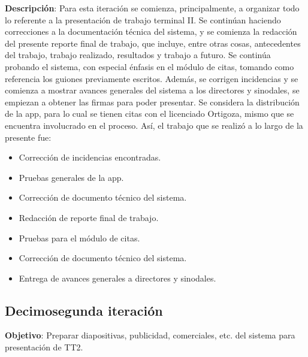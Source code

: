 \noindent
\textbf{Descripción}: Para esta iteración se comienza, principalmente, a organizar todo lo referente a la presentación de trabajo terminal II. Se continúan haciendo correcciones a la documentación técnica del sistema, y se comienza la redacción del presente reporte final de trabajo, que incluye, entre otras cosas, antecedentes del trabajo, trabajo realizado, resultados y trabajo a futuro.
\newline
\newline
Se continúa probando el sistema, con especial énfasis en el módulo de citas, tomando como referencia los guiones previamente escritos. Además, se corrigen incidencias y se comienza a mostrar avances generales del sistema a los directores y sinodales, se empiezan a obtener las firmas para poder presentar. Se considera la distribución de la app, para lo cual se tienen citas con el licenciado Ortigoza, mismo que se encuentra involucrado en el proceso.  
\newline
Así, el trabajo que se realizó a lo largo de la presente fue:
\begin{itemize}
	\item Corrección de incidencias encontradas.
	\item Pruebas generales de la app. 
	\item Corrección de documento técnico del sistema.
	\item Redacción de reporte final de trabajo.
	\item Pruebas para el módulo de citas.
	\item Corrección de documento técnico del sistema.
	\item Entrega de avances generales a directores y sinodales.
\end{itemize}


\subsection{Decimosegunda iteración} 

\noindent
\textbf{Objetivo}: Preparar diapositivas, publicidad, comerciales, etc. del sistema para presentación de TT2.
\newline

